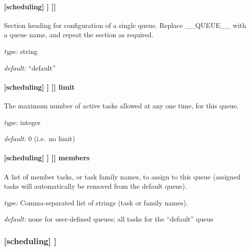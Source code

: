 \paragraph[{[[[}\_\_QUEUE\_\_{]]]}]{[scheduling] \textrightarrow [[queues]] \textrightarrow [[[\_\_QUEUE\_\_]]]}

Section heading for configuration of a single queue. Replace
\_\_QUEUE\_\_ with a queue name, and repeat the section as required.

\begin{myitemize}
\item {\em type:} string
\item {\em default:} ``default''
\end{myitemize}

\paragraph[limit]{[scheduling] \textrightarrow [[queues]] \textrightarrow [[[\_\_QUEUE\_\_]]] \textrightarrow limit}

The maximum number of active tasks allowed at any one time, for this queue.
\begin{myitemize}
\item {\em type:} integer
\item {\em default:} 0 (i.e.\ no limit)
\end{myitemize}

\paragraph[members]{[scheduling] \textrightarrow [[queues]] \textrightarrow [[[\_\_QUEUE\_\_]]] \textrightarrow members}

A list of member tasks, or task family names, to assign to this queue
(assigned tasks will automatically be removed from the default queue).
\begin{myitemize}
\item {\em type:} Comma-separated list of strings (task or family names).
\item {\em default:} none for user-defined queues; all tasks for the ``default'' queue
\end{myitemize}

\subsubsection[{[[}special tasks{]]}]{[scheduling] \textrightarrow [[special tasks]]}

